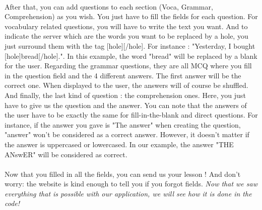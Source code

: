 \paragraph{}
After that, you can add questions to each section (Voca, Grammar, Comprehension) as you wish. You just have to fill the fields for each question. \linebreak
For vocabulary related questions, you will have to write the text you want. And to indicate the server which are the words you want to be replaced by a hole, you just surround them with the tag [hole][/hole]. For instance : "Yesterday, I bought [hole]bread[/hole].". In this example, the word "bread" will be replaced by a blank for the user. \linebreak
Regarding the grammar questions, they are all MCQ where you fill in the question field and the 4 different answers. The first answer will be the correct one. When displayed to the user, the answers will of course be shuffled. \linebreak
And finally, the last kind of question : the comprehension ones. Here, you just have to give us the question and the answer. \linebreak
You can note that the answers of the user have to be exactly the same for fill-in-the-blank and direct questions. For instance, if the answer you gave is "The answer" when creating the question, "answer" won't be considered as a correct answer. However, it doesn't matter if the answer is uppercased or lowercased. In our example, the answer "THE ANswER" will be considered as correct.

\paragraph{}
Now that you filled in all the fields, you can send us your lesson ! And don't worry: the website is kind enough to tell you if you forgot fields. \linebreak
\emph{Now that we saw everything that is possible with our application, we will see how it is done in the code!}

